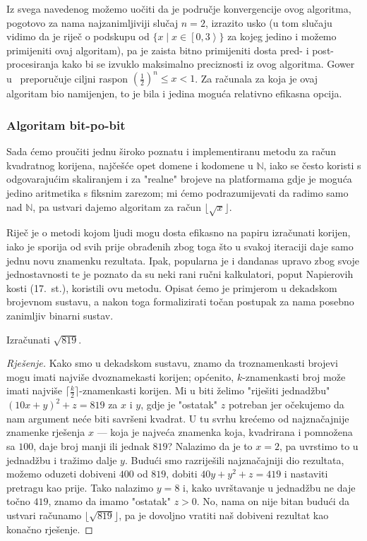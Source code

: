 \documentclass[12pt]{scrartcl}
\newcommand{\primjer}[2]{%
    \renewcommand\qedsymbol{$\vartriangleleft$}%
    \begin{example}%
        #1%
    \end{example}%
    \begin{proof}[Rješenje]%
        #2%
    \end{proof}%
    \renewcommand\qedsymbol{$\square$}
}
\begin{document}
Iz svega navedenog možemo uočiti da je područje konvergencije ovog algoritma, pogotovo za nama najzanimljiviji slučaj $n=2$, izrazito usko
(u tom slučaju vidimo da je riječ o podskupu od $\{x\mid x\in\left[0,3\right>\}$ za kojeg jedino i možemo primijeniti ovaj algoritam), pa je
zaista bitno primijeniti dosta pred- i post-procesiranja kako bi se izvuklo maksimalno preciznosti iz ovog algoritma.
Gower u~\cite{gower} preporučuje ciljni raspon $(\frac12)^n\leq x<1$.
Za računala za koja je
ovaj algoritam bio
namijenjen, to je bila i jedina moguća relativno efikasna opcija.

\subsubsection{Algoritam bit-po-bit}
Sada ćemo proučiti jednu široko poznatu i implementiranu metodu za račun kvadratnog korijena, najčešće opet domene i kodomene u
$\mathbb{N}$, iako se često koristi s odgovarajućim skaliranjem i za "realne" brojeve
 na platformama gdje je moguća jedino aritmetika s fiksnim zarezom; mi ćemo podrazumijevati da radimo samo nad $\mathbb N$, pa ustvari
 dajemo algoritam za račun $\lfloor\sqrt x\rfloor$.

Riječ je o metodi kojom ljudi mogu dosta efikasno na papiru izračunati korijen, iako je sporija od svih prije obrađenih zbog toga
što u svakoj iteraciji daje samo jednu novu znamenku rezultata. Ipak, popularna je i dandanas upravo zbog svoje jednostavnosti te je
poznato da su neki rani ručni kalkulatori, poput Napierovih kosti (17.\ st.), koristili ovu metodu.
 Opisat ćemo je primjerom
u dekadskom brojevnom sustavu, a nakon toga formalizirati točan postupak za nama posebno zanimljiv binarni sustav.

\primjer{Izračunati $\sqrt{819}$.}
{Kako smo u dekadskom sustavu, znamo da troznamenkasti brojevi mogu imati najviše dvoznamekasti korijen; općenito, $k$-znamenkasti broj
može imati najviše $\lceil\frac{k}{2}\rceil$-znamenkasti korijen. Mi u biti želimo "riješiti jednadžbu" $(10x+y)^2+z=819$ za $x$ i $y$, gdje je 
"ostatak" $z$ potreban jer očekujemo da nam argument neće biti savršeni kvadrat. U tu svrhu krećemo od najznačajnije znamenke rješenja
$x$ --- koja je najveća znamenka koja, kvadrirana i pomnožena sa $100$, daje broj manji ili jednak $819$? Nalazimo da je to $x=2$, pa
uvrstimo to u jednadžbu i tražimo dalje $y$. Budući smo razriješili najznačajniji dio rezultata, možemo oduzeti dobiveni $400$ od $819$,
dobiti $40y+y^2+z=419$
i nastaviti pretragu kao prije. Tako nalazimo $y=8$ i, kako uvrštavanje u jednadžbu ne daje točno $419$,
znamo da imamo "ostatak" $z>0$. No, nama on nije bitan budući da ustvari računamo $\lfloor\sqrt{819}\rfloor$, pa je
 dovoljno vratiti naš dobiveni rezultat kao konačno rješenje.}
\end{document}
